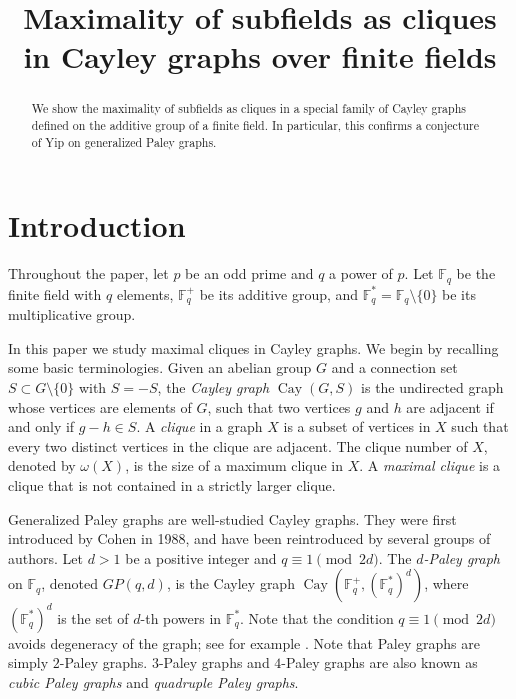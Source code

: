 \documentclass[Unicode,ALCO,published]{cedram}
\title[Maximality of subfields as cliques in Cayley graphs]{Maximality of subfields as cliques in Cayley graphs over finite fields}
\author[\initial{C. H.} Yip]{\firstname{Chi Hoi}  \lastname{Yip}}
\newcommand{\F}{\mathbb{F}}
\begin{document}
\begin{abstract}
We show the maximality of subfields as cliques in a special family of Cayley graphs defined on the additive group of a finite field. In particular, this confirms a conjecture of Yip on generalized Paley graphs.
\end{abstract}


\maketitle

\section{Introduction}

Throughout the paper, let $p$ be an odd prime and $q$ a power of $p$. Let $\F_q$ be the finite field with $q$ elements, $\F_q^+$ be its additive group, and $\F_q^*=\F_q \setminus \{0\}$ be its multiplicative group. 

In this paper we study maximal cliques in Cayley graphs. We begin by recalling some basic terminologies. Given an abelian group $G$ and a connection set $S \subset G \setminus \{0\}$ with $S=-S$, the {\em Cayley graph} $\operatorname{Cay}(G,S)$ is
the undirected graph whose vertices are elements of $G$, such that two vertices $g$ and $h$ are adjacent if and only if $g-h \in S$. A {\em clique} in a graph $X$ is a subset of vertices in $X$ such that every two distinct vertices in the clique are adjacent. The clique number of $X$, denoted by $\omega(X)$, is the size of a maximum clique in $X$. A {\em maximal clique} is a clique that is not contained in a strictly larger clique. 

Generalized Paley graphs are well-studied Cayley graphs. They were first introduced by Cohen \cite{SC} in 1988, and have been reintroduced by several groups of authors. Let $d>1$ be a positive integer and $q \equiv 1 \pmod {2d}$. The {\em $d$-Paley graph} on $\F_q$, denoted $GP(q,d)$, is the Cayley graph $\operatorname{Cay}(\F_q^+,(\F_q^*)^d)$, where $(\F_q^*)^d$ is the set of $d$-th powers in $\F_q^*$. Note that the condition $q \equiv 1 \pmod {2d}$ avoids degeneracy of the graph; see for example \cite[Section 4]{SC}. Note that Paley graphs are simply $2$-Paley graphs. $3$-Paley graphs and $4$-Paley graphs are also known as \emph{cubic Paley graphs} and \emph{quadruple Paley graphs}. 
\end{document}
